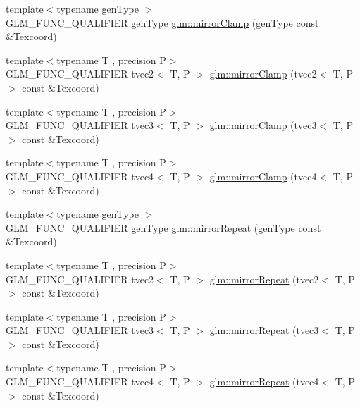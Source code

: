 \begin{DoxyCompactItemize}
\item 
{\footnotesize template$<$typename gen\+Type $>$ }\\G\+L\+M\+\_\+\+F\+U\+N\+C\+\_\+\+Q\+U\+A\+L\+I\+F\+I\+E\+R gen\+Type \hyperlink{group__gtx__wrap_gaa6856a0a048d2749252848da35e10c8b}{glm\+::mirror\+Clamp} (gen\+Type const \&Texcoord)
\item 
{\footnotesize template$<$typename T , precision P$>$ }\\G\+L\+M\+\_\+\+F\+U\+N\+C\+\_\+\+Q\+U\+A\+L\+I\+F\+I\+E\+R tvec2$<$ T, P $>$ \hyperlink{namespaceglm_adebe151810a11d00420dbc8e645dd2f4}{glm\+::mirror\+Clamp} (tvec2$<$ T, P $>$ const \&Texcoord)
\item 
{\footnotesize template$<$typename T , precision P$>$ }\\G\+L\+M\+\_\+\+F\+U\+N\+C\+\_\+\+Q\+U\+A\+L\+I\+F\+I\+E\+R tvec3$<$ T, P $>$ \hyperlink{namespaceglm_a351ab91b9a08eab89ea19fd541b1b03d}{glm\+::mirror\+Clamp} (tvec3$<$ T, P $>$ const \&Texcoord)
\item 
{\footnotesize template$<$typename T , precision P$>$ }\\G\+L\+M\+\_\+\+F\+U\+N\+C\+\_\+\+Q\+U\+A\+L\+I\+F\+I\+E\+R tvec4$<$ T, P $>$ \hyperlink{namespaceglm_a34d59b331fd9c3f69c5921312c76da57}{glm\+::mirror\+Clamp} (tvec4$<$ T, P $>$ const \&Texcoord)
\item 
{\footnotesize template$<$typename gen\+Type $>$ }\\G\+L\+M\+\_\+\+F\+U\+N\+C\+\_\+\+Q\+U\+A\+L\+I\+F\+I\+E\+R gen\+Type \hyperlink{group__gtx__wrap_ga16a89b0661b60d5bea85137bbae74d73}{glm\+::mirror\+Repeat} (gen\+Type const \&Texcoord)
\item 
{\footnotesize template$<$typename T , precision P$>$ }\\G\+L\+M\+\_\+\+F\+U\+N\+C\+\_\+\+Q\+U\+A\+L\+I\+F\+I\+E\+R tvec2$<$ T, P $>$ \hyperlink{namespaceglm_a3ef76b9b162788aafa64b1483ad74269}{glm\+::mirror\+Repeat} (tvec2$<$ T, P $>$ const \&Texcoord)
\item 
{\footnotesize template$<$typename T , precision P$>$ }\\G\+L\+M\+\_\+\+F\+U\+N\+C\+\_\+\+Q\+U\+A\+L\+I\+F\+I\+E\+R tvec3$<$ T, P $>$ \hyperlink{namespaceglm_a34a384753e18a9ffd563d655acd01ca3}{glm\+::mirror\+Repeat} (tvec3$<$ T, P $>$ const \&Texcoord)
\item 
{\footnotesize template$<$typename T , precision P$>$ }\\G\+L\+M\+\_\+\+F\+U\+N\+C\+\_\+\+Q\+U\+A\+L\+I\+F\+I\+E\+R tvec4$<$ T, P $>$ \hyperlink{namespaceglm_a14141287fb517976eebbc9495bc29693}{glm\+::mirror\+Repeat} (tvec4$<$ T, P $>$ const \&Texcoord)
\end{DoxyCompactItemize}


